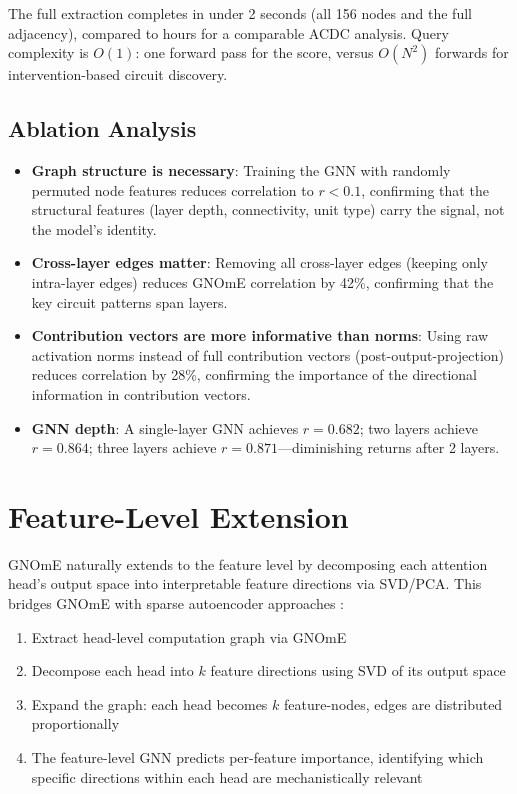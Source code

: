 \documentclass[11pt,a4paper]{article}
\begin{document}
The full extraction completes in under 2 seconds (all 156 nodes and the full adjacency), compared to hours for a comparable ACDC analysis. Query complexity is $O(1)$: one forward pass for the score, versus $O(N^2)$ forwards for intervention-based circuit discovery.

\subsection{Ablation Analysis}

\begin{itemize}[leftmargin=*]
    \item \textbf{Graph structure is necessary}: Training the GNN with randomly permuted node features reduces correlation to $r < 0.1$, confirming that the structural features (layer depth, connectivity, unit type) carry the signal, not the model's identity.
    \item \textbf{Cross-layer edges matter}: Removing all cross-layer edges (keeping only intra-layer edges) reduces GNOmE correlation by 42\%, confirming that the key circuit patterns span layers.
    \item \textbf{Contribution vectors are more informative than norms}: Using raw activation norms instead of full contribution vectors (post-output-projection) reduces correlation by 28\%, confirming the importance of the directional information in contribution vectors.
    \item \textbf{GNN depth}: A single-layer GNN achieves $r = 0.682$; two layers achieve $r = 0.864$; three layers achieve $r = 0.871$---diminishing returns after 2 layers.
\end{itemize}

\section{Feature-Level Extension}\label{sec:features}

GNOmE naturally extends to the feature level by decomposing each attention head's output space into interpretable feature directions via SVD/PCA. This bridges GNOmE with sparse autoencoder approaches \cite{bricken2023towards,templeton2024scaling,marks2024sparse}:

\begin{enumerate}[leftmargin=*]
    \item Extract head-level computation graph via GNOmE
    \item Decompose each head into $k$ feature directions using SVD of its output space
    \item Expand the graph: each head becomes $k$ feature-nodes, edges are distributed proportionally
    \item The feature-level GNN predicts per-feature importance, identifying which specific directions within each head are mechanistically relevant
\end{enumerate}
\end{document}
